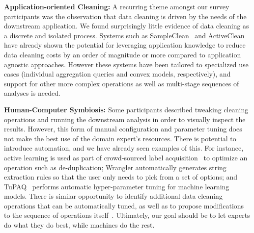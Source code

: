 % 
\vspace{0.5em}
\noindent\textbf{Application-oriented Cleaning:}  A recurring theme amongst our survey participants was the observation that data cleaning is driven by the needs of the downstream application.  We found surprisingly little evidence of data cleaning as a discrete and isolated process. Systems such as SampleClean~\cite{DBLP:journals/debu/KrishnanWFGKM015} and ActiveClean~\cite{activecleanarxiv} have already shown the potential for leveraging application knowledge to reduce data cleaning costs by an order of magnitude or more compared to application agnostic approaches.  However these systems have been tailored to specialized use cases (individual aggregation queries and convex models, respectively), and support for other more complex operations as well as multi-stage sequences of analyses is needed.

\vspace{0.5em}
\noindent\textbf{Human-Computer Symbiosis:}   Some participants described tweaking cleaning operations and running the downstream analysis in order to visually inspect the results.  However, this form of manual configuration and parameter tuning does not make the best use of the domain expert's resources.   There is potential to introduce automation, and we have already seen examples of this.  For instance, active learning is used as part of crowd-sourced label acquisition~\cite{gokhale2014corleone,DBLP:journals/pvldb/HaasW0F15} to optimize an operation such as de-duplication;  Wrangler automatically generates string extraction rules so that the user only needs to pick from a set of options; and TuPAQ~\cite{sparks2015automating} performs automatic hyper-parameter tuning for machine learning models.   There is similar opportunity to identify additional data cleaning operations that can be automatically tuned, as well as to propose modifications to the sequence of operations itself~\cite{wisteria}.  Ultimately, our goal should be to let experts do what they do best, while machines do the rest.

